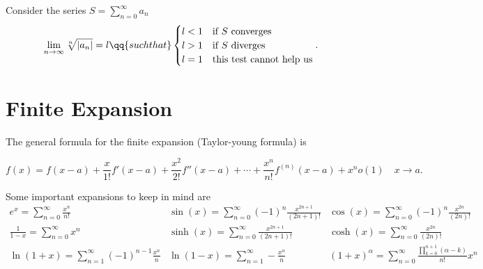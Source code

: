 \begin{theorem}
    Consider the series $S=\sum_{n=0}^{\infty} a_n$
    \[
        \lim_{n \to \infty}\sqrt[n]{|a_n|} = l\qq{such that} \begin{cases}l<1& \text{if $S$ converges}\\
        l>1& \text{if $S$ diverges}\\
l=1& \text{this test cannot help us}\\
\end{cases} 
.\]
        \end{theorem}
\section{Finite Expansion}
The general formula for the finite expansion (Taylor-young formula) is 

\[
    f(x) = f(x-a)+ \frac{x}{1!}f'(x-a)+\frac{x^2}{2!}f''(x-a)+\cdots+\frac{x^n}{n!}f^{(n)}(x-a)+x^no(1) \quad x\to a
.\]
 
Some important expansions to keep in mind are
\[\renewcommand{\arraystretch}{2.5}
\begin{array}{l|l|l}
    e^x=\sum_{n=0}^{\infty} \frac{x^n}{n!}\quad & \sin(x)=\sum_{n=0}^{\infty} (-1)^n \frac{x^{2n+1}}{(2n+1)!}&\cos(x)=\sum_{n=0}^{\infty} (-1)^n \frac{x^{2n}}{(2n)!}\\
            \frac{1}{1-x}=\sum_{n=0}^{\infty} x^n&\sinh(x)=\sum_{n=0}^{\infty} \frac{x^{2n+1}}{(2n+1)!}&\cosh(x)=\sum_{n=0}^{\infty} \frac{x^{2n}}{(2n)!}\\
            \ln(1+x)=\sum_{n=1}^{\infty} (-1)^{n-1}\frac{x^n}{n}&\ln(1-x)=\sum_{n=1}^{\infty} -\frac{x^n}{n}&(1+x)^\alpha=\sum_{n=0}^{\infty} \frac{\prod_{k=0}^{n+1}(\alpha-k)  }{n!}x^n
\end{array}
\]
